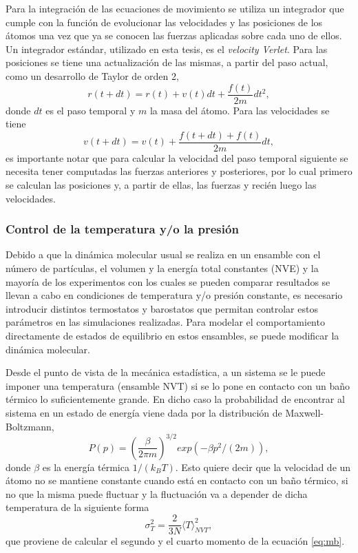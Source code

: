 Para la integración de las ecuaciones de movimiento se utiliza un integrador que 
cumple con la función de evolucionar las velocidades y las posiciones de los 
átomos una vez que ya se conocen las fuerzas aplicadas sobre cada uno de ellos.
Un integrador estándar, utilizado en esta tesis, es el \textit{velocity Verlet}. 
Para las posiciones se tiene una actualización de las mismas, a partir
del paso actual, como un desarrollo de Taylor de orden 2,
\begin{equation}
    r(t+dt) = r(t) + v(t) dt + \frac{f(t)}{2m} dt^2,
\end{equation}
donde $dt$ es el paso temporal y $m$ la masa del átomo. Para las velocidades se
tiene
\begin{equation}
    v(t+dt) = v(t) + \frac{f(t+dt)+f(t)}{2m} dt,
\end{equation}
es importante notar que para calcular la velocidad del paso temporal siguiente se
necesita tener computadas las fuerzas anteriores y posteriores, por lo cual
primero se calculan las posiciones y, a partir de ellas, las fuerzas y recién 
luego las velocidades. 


\subsubsection{Control de la temperatura y/o la presión}

Debido a que la dinámica molecular usual se realiza en un ensamble con el número 
de partículas, el volumen y la energía total constantes (NVE) y la mayoría de los
experimentos con los cuales se pueden comparar resultados se llevan a cabo en 
condiciones de temperatura y/o presión constante, es necesario introducir 
distintos termostatos y barostatos que permitan controlar estos parámetros en las 
simulaciones realizadas. Para modelar el comportamiento directamente de estados
de equilibrio en estos ensambles, se puede modificar la dinámica molecular. 

Desde el punto de vista de la mecánica estadística, a un sistema se le puede 
imponer una temperatura (ensamble NVT) si se lo pone en contacto con un baño 
térmico lo suficientemente grande. En dicho caso la probabilidad de encontrar al 
sistema en un estado de energía viene dada por la distribución de 
Maxwell-Boltzmann,
\begin{equation}\label{eq:mb}
    P(p) = \left( \frac{\beta}{2\pi m} \right)^{3/2} exp(-\beta p^2 / (2m)),
\end{equation}
donde $\beta$ es la energía térmica $1 / (k_B T)$. Esto quiere decir que la velocidad 
de un átomo no se mantiene constante cuando está en contacto con un baño térmico, 
si no que la misma puede fluctuar y la fluctuación va a depender de dicha 
temperatura de la siguiente forma
\begin{equation}
    \sigma_T^2 = \frac{2}{3 N} \langle T \rangle_{NVT}^2,
\end{equation}
que proviene de calcular el segundo y el cuarto momento de la ecuación 
\ref{eq:mb}.

